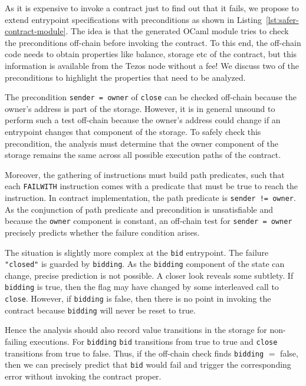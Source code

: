 \documentclass[a4paper,USenglish,american,cleveref, autoref, thm-restate]{oasics-v2021}
\begin{document}
As it is expensive to invoke a contract just to find out that it
fails, we propose to extend entrypoint specifications with
preconditions as shown in Listing~\ref{lst:safer-contract-module}. The
idea is that the generated OCaml module tries to check the
preconditions off-chain before invoking the contract. To this end, the
off-chain code needs to obtain properties like balance, storage etc of the
contract, but this information is available from the Tezos node without a fee!
We discuss two of the preconditions to highlight the properties that 
need to be analyzed. 

The precondition \lstinline/sender = owner/ of \lstinline/close/ can
be checked off-chain because the owner's address is part of the
storage. However, it is in general unsound to perform such a test
off-chain because the owner's address could change if an entrypoint
changes that component of the storage. To safely check this
precondition, the analysis must determine that the owner component of
the storage remains the same across all possible execution paths of
the contract.

Moreover, the gathering of instructions must build path predicates,
such that each \lstinline/FAILWITH/ instruction comes with a predicate
that must be true to reach the instruction. In contract
implementation, the path predicate is \lstinline/sender != owner/. As
the conjunction of path predicate and precondition is unsatisfiable
and because the \lstinline/owner/ component is constant, an off-chain
test for \lstinline/sender = owner/ precisely predicts whether the
failure condition arises.

The situation is slightly more complex at the \lstinline/bid/
entrypoint. The failure \lstinline/"closed"/ is guarded by
\lstinline/bidding/. As the \lstinline/bidding/ component of the state can change,
precise prediction is not possible. A closer look reveals some
subtlety. If \lstinline/bidding/ is true, then the flag may have
changed by some interleaved call to \lstinline/close/. However, if
\lstinline/bidding/ is false, then there is no point in invoking the
contract because \lstinline/bidding/ will never be reset to true.

Hence the analysis should also record value transitions in the
storage for non-failing executions. For \lstinline/bidding/
\lstinline/bid/ transitions from true to true and \lstinline/close/
transitions from true to false. Thus, if the off-chain check finds
\lstinline/bidding/ $=$ false, then we can precisely predict that
\lstinline/bid/ would fail and trigger the corresponding error without
invoking the contract proper.
\end{document}
